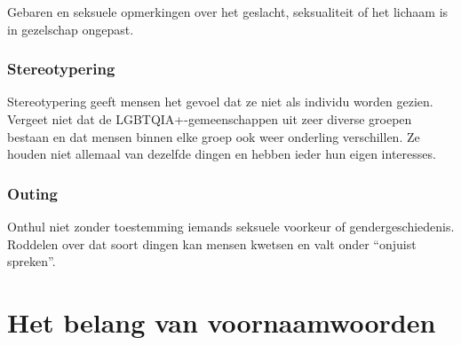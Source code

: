 \documentclass[12pt,openany]{book}
\begin{document}
Gebaren en seksuele opmerkingen over het geslacht, seksualiteit of het lichaam is in gezelschap ongepast.

\subsubsection*{Stereotypering}

Stereotypering geeft mensen het gevoel dat ze niet als individu worden gezien. Vergeet niet dat de LGBTQIA+-gemeenschappen uit zeer diverse groepen bestaan en dat mensen binnen elke groep ook weer onderling verschillen. Ze houden niet allemaal van dezelfde dingen en hebben ieder hun eigen interesses. 

\subsubsection*{Outing}

Onthul niet zonder toestemming iemands seksuele voorkeur of gendergeschiedenis. Roddelen over dat soort dingen kan mensen kwetsen en valt onder “onjuist spreken”.

\begin{figure}[h]
    \centering
\end{figure}

\section*{Het belang van voornaamwoorden}
\end{document}
